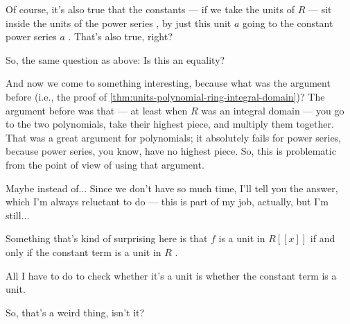 \begin{speech}[00:35:07 - 00:36:51]
Of course, it's also true that the constants --- if we take the units of $R$ --- sit inside the units of the power series , by just this unit $a$ going to the constant power series $a$ . That's also true, right?

So, the same question as above: Is this an equality?

And now we come to something interesting, because what was the argument before (i.e., the proof of \cref{thm:units-polynomial-ring-integral-domain})? The argument before was that --- at least when $R$ was an integral domain --- you go to the two polynomials, take their highest piece, and multiply them together. That was a great argument for polynomials; it absolutely fails for power series, because power series, you know, have no highest piece. So, this is problematic from the point of view of using that argument.

Maybe instead of... Since we don't have so much time, I'll tell you the answer, which I'm always reluctant to do --- this is part of my job, actually, but I'm still...

Something that's kind of surprising here is that $f$ is a unit in $R[[x]]$ if and only if the constant term is a unit in $R$ .

All I have to do to check whether it's a unit is whether the constant term is a unit.

So, that's a weird thing, isn't it?
\end{speech}

